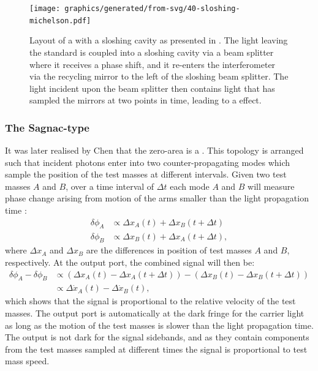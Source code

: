 \begin{figure}
  \centering
  \texttt{[image: graphics/generated/from-svg/40-sloshing-michelson.pdf]}
  \caption[Layout of a \MI{} with a sloshing cavity]{\label{fig:sloshing-michelson}Layout of a \MI{} with a sloshing cavity as presented in \cite{Purdue2002}. The light leaving the standard \MI{} is coupled into a sloshing cavity via a beam splitter where it receives a phase shift, and it re-enters the interferometer via the recycling mirror to the left of the sloshing beam splitter. The light incident upon the beam splitter then contains light that has sampled the mirrors at two points in time, leading to a \SM{} effect.}
\end{figure}

\subsubsection{The Sagnac-type \SM{}}
It was later realised by Chen that the zero-area \SSM{} is a \SM{} \cite{Chen2003}. This topology is arranged such that incident photons enter into two counter-propagating modes which sample the position of the test masses at different intervals. Given two test masses $A$ and $B$, over a time interval of $\Delta t$ each mode $A$ and $B$ will measure phase change arising from motion of the arms smaller than the light propagation time \cite{Chen2003}:
\begin{align}
  \delta \phi_{A} &\propto \Delta x_{A} \left( t \right) + \Delta x_{B} \left( t + \Delta t \right) \\
  \delta \phi_{B} &\propto \Delta x_{B} \left( t \right) + \Delta x_{A} \left( t + \Delta t \right),
\end{align}
where $\Delta x_{A}$ and $\Delta x_{B}$ are the differences in position of test masses $A$ and $B$, respectively. At the output port, the combined signal will then be:
\begin{equation}
  \begin{split}
    \delta \phi_{A} - \delta \phi_{B} &\propto \left( \Delta x_{A} \left( t \right) - \Delta x_{A} \left( t + \Delta t \right) \right) - \left( \Delta x_{B} \left( t \right) - \Delta x_{B} \left( t + \Delta t \right) \right) \\
                                      &\propto \Delta \dot{x}_{A} \left( t \right) - \Delta \dot{x}_{B} \left( t \right),
  \end{split}
\end{equation}
which shows that the signal is proportional to the relative velocity of the test masses. The output port is automatically at the dark fringe for the carrier light as long as the motion of the test masses is slower than the light propagation time. The output is not dark for the signal sidebands, and as they contain components from the test masses sampled at different times the signal is proportional to test mass speed.

